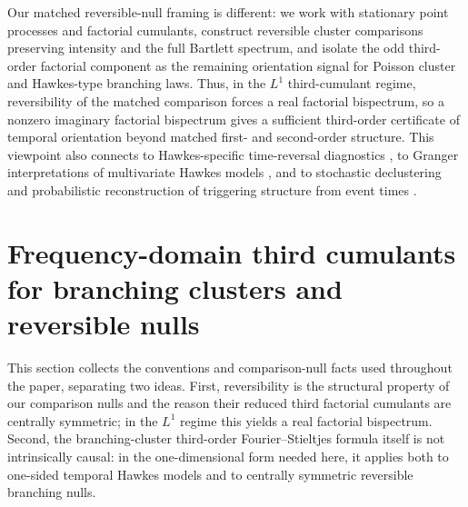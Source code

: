 \documentclass[aap,press]{apt} \volno{00} \partno{00}
\newcommand{\1}{\mathbf{1}}
\numberwithin{equation}{section}
\begin{document}
Our matched
reversible-null framing is different: we work with stationary point
processes and factorial cumulants, construct reversible cluster
comparisons preserving intensity and the full Bartlett spectrum, and
isolate the odd third-order factorial component as the remaining
orientation signal for Poisson cluster and Hawkes-type branching laws.
Thus, in the $L^1$ third-cumulant regime, reversibility of the matched
comparison forces a real factorial bispectrum, so a nonzero imaginary
factorial bispectrum gives a sufficient third-order certificate of
temporal orientation beyond matched first- and second-order structure.
This viewpoint also connects to Hawkes-specific time-reversal
diagnostics \cite{CordiChalletMuniToke2018}, to Granger interpretations
of multivariate Hawkes models \cite{EichlerDahlhausDueck2017}, and to
stochastic declustering and probabilistic reconstruction of triggering
structure from event times \cite{ZhuangOgataVereJones2002}.


\section{Frequency-domain third cumulants for branching clusters and reversible nulls}

This section collects the conventions and comparison-null facts used throughout the paper, separating two ideas. First, reversibility is the structural property of our comparison nulls and the reason their reduced third factorial cumulants are centrally symmetric; in the $L^1$ regime this yields a real factorial bispectrum. Second, the branching-cluster third-order Fourier--Stieltjes formula itself is not intrinsically causal: in the one-dimensional form needed here, it applies both to one-sided temporal Hawkes models and to centrally symmetric reversible branching nulls.
\end{document}
